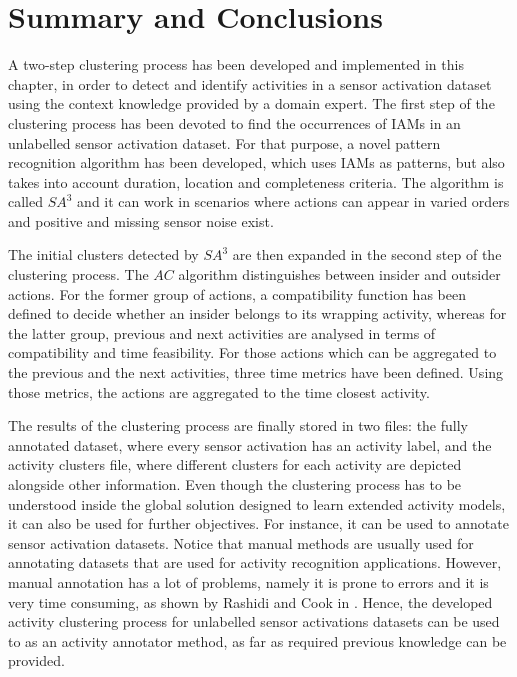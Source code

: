 \section{Summary and Conclusions}
\label{sec:clustering:sum}

A two-step clustering process has been developed and implemented in this chapter, in order to detect and identify activities in a sensor activation dataset using the context knowledge provided by a domain expert. The first step of the clustering process has been devoted to find the occurrences of IAMs in an unlabelled sensor activation dataset. For that purpose, a novel pattern recognition algorithm has been developed, which uses IAMs as patterns, but also takes into account duration, location and completeness criteria. The algorithm is called $SA^3$ and it can work in scenarios where actions can appear in varied orders and positive and missing sensor noise exist.

The initial clusters detected by $SA^3$ are then expanded in the second step of the clustering process. The $AC$ algorithm distinguishes between insider and outsider actions. For the former group of actions, a compatibility function has been defined to decide whether an insider belongs to its wrapping activity, whereas for the latter group, previous and next activities are analysed in terms of compatibility and time feasibility. For those actions which can be aggregated to the previous and the next activities, three time metrics have been defined. Using those metrics, the actions are aggregated to the time closest activity. 

The results of the clustering process are finally stored in two files: the fully annotated dataset, where every sensor activation has an activity label, and the activity clusters file, where different clusters for each activity are depicted alongside other information. Even though the clustering process has to be understood inside the global solution designed to learn extended activity models, it can also be used for further objectives. For instance, it can be used to annotate sensor activation datasets. Notice that manual methods are usually used for annotating datasets that are used for activity recognition applications. However, manual annotation has a lot of problems, namely it is prone to errors and it is very time consuming, as shown by Rashidi and Cook in \cite{Rashidi2011}. Hence, the developed activity clustering process for unlabelled sensor activations datasets can be used to as an activity annotator method, as far as required previous knowledge can be provided. 